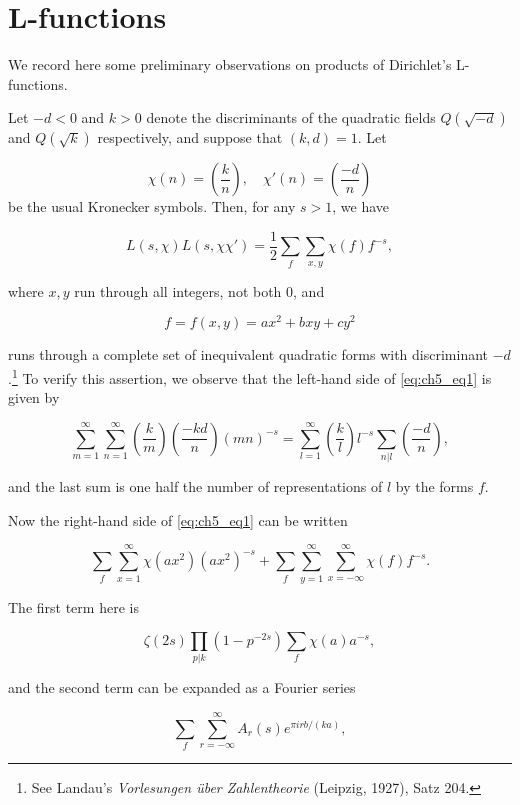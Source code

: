 \section{L-functions}\label{sec:ch5_2}

We record here some preliminary observations on products of Dirichlet's L-functions.

Let $-d < 0$ and $k > 0$ denote the discriminants of the quadratic fields $Q(\sqrt{-d})$ and $Q(\sqrt{k})$ respectively, and suppose that $(k,d) = 1$. Let

\[ \chi(n) = \left(\frac{k}{n}\right), \quad \chi'(n) = \left(\frac{-d}{n}\right) \]
be the usual Kronecker symbols. Then, for any $s > 1$, we have

\begin{equation}\tag{1}\label{eq:ch5_eq1}
L(s,\chi)L(s,\chi\chi') = \frac{1}{2}\sum_{f}\sum_{x,y}\chi(f)f^{-s},
\end{equation}

where $x, y$ run through all integers, not both 0, and

\[f = f(x, y) = ax^2 + bxy + cy^2\]

runs through a complete set of inequivalent quadratic forms with discriminant $-d$.\footnote{See Landau's \textit{Vorlesungen über Zahlentheorie} (Leipzig, 1927), Satz 204.} To verify this assertion, we observe that the left-hand side of \eqref{eq:ch5_eq1} is given by

\[\sum_{m=1}^{\infty}\sum_{n=1}^{\infty}\left(\frac{k}{m}\right)\left(\frac{-kd}{n}\right)(mn)^{-s}=\sum_{l=1}^{\infty}\left(\frac{k}{l}\right)l^{-s}\sum_{n|l}\left(\frac{-d}{n}\right),\]

and the last sum is one half the number of representations of $l$ by the forms $f$.

Now the right-hand side of \eqref{eq:ch5_eq1} can be written

\[\sum_{f} \sum_{x=1}^{\infty} \chi(ax^2) (ax^2)^{-s} + \sum_{f} \sum_{y=1}^{\infty} \sum_{x=-\infty}^{\infty} \chi(f) f^{-s}.\]

The first term here is

\[\zeta(2s) \prod_{p|k} (1-p^{-2s}) \sum_{f} \chi(a) a^{-s},\]

and the second term can be expanded as a Fourier series

\[\sum_{f} \sum_{r=-\infty}^{\infty} A_r(s) e^{\pi i r b/(ka)},\]

